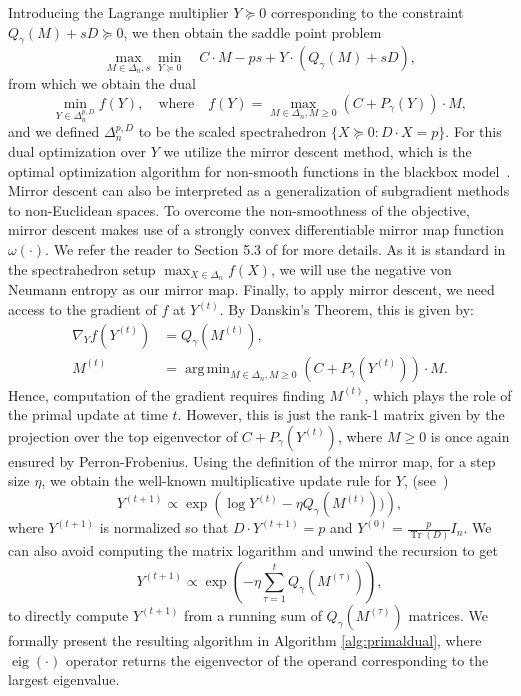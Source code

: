 \documentclass{article}
\DeclareMathOperator{\Tr}{Tr}
\DeclareMathOperator{\argmin}{arg\,min}
\begin{document}
Introducing the Lagrange multiplier $Y \succeq 0$ corresponding to the constraint $Q_\gamma(M) + s D \succeq 0$, we then obtain the saddle point problem
\[ \max_{M \in \Delta_n, s} \min_{Y \succeq 0} \quad C \cdot M - p s + Y \cdot (Q_\gamma(M) + s D), \]
from which we obtain the dual 
\begin{equation*}
  \min_{Y \in \Delta_n^{p,D}} f(Y), \quad \textrm{where} \quad f(Y) = \max_{M \in \Delta_n, M \geq 0} \left( C + P_\gamma(Y) \right) \cdot M,
  \label{eq:primaldual}
\end{equation*}
and we defined $\Delta_n^{p,D}$ to be the scaled spectrahedron $\{ X \succeq 0 : D \cdot X = p \}$.
For this dual optimization over $Y$ we utilize the mirror descent method, which is the optimal optimization algorithm for non-smooth functions in the blackbox model~\cite{lectures}. Mirror descent can also be interpreted as a generalization of subgradient methods to non-Euclidean spaces.
To overcome the non-smoothness of the objective, mirror descent makes use of a strongly convex differentiable mirror map function $\omega(\cdot)$. We refer the reader to Section 5.3 of \cite{lectures} for more details.
%
As it is standard in the spectrahedron setup $\max_{X \in \Delta_n} f(X)$, we will use the negative von Neumann entropy 
as our mirror map. 
Finally, to apply mirror descent, we need access to the gradient of $f$ at $Y^{(t)}$. By Danskin's Theorem, this is given by:
\begin{align*}
\nabla_Y f(Y^{(t)}) & = Q_\gamma(M^{(t)}), \\
M^{(t)} & = \argmin_{M \in \Delta_n, M \geq 0} (C + P_\gamma(Y^{(t)}))\cdot M  .
\end{align*}
Hence, computation of the gradient requires finding $M^{(t)}$, which plays the role of the primal update at time $t$. However, this is just the rank-1 matrix given by the projection over the top eigenvector of $C + P_\gamma(Y^{(t)})$, where $M \geq 0$ is once again ensured by Perron-Frobenius.
Using the definition of the mirror map, for a step size $\eta$, we obtain the well-known multiplicative update rule for $Y$, (see~\cite{Kivinen1997})
\begin{equation*}%
  Y^{(t+1)} \propto \exp \left( \log Y^{(t)} - \eta Q_\gamma(M^{(t)})) \right),
\end{equation*}
where $Y^{(t+1)}$ is normalized so that $D \cdot Y^{(t+1)} = p$ and $Y^{(0)} = \frac{p}{\Tr(D)} I_n$. 
We can also avoid computing the matrix logarithm and unwind the recursion to get
\[ Y^{(t+1)} \propto \exp \left( -\eta \sum_{\tau=1}^t Q_\gamma(M^{(\tau)}) \right), \]
to directly compute $Y^{(t+1)}$ from a running sum of $Q_\gamma(M^{(\tau)})$ matrices.
We formally present the resulting algorithm in Algorithm \ref{alg:primaldual}, where $\operatorname{eig}(\cdot)$ operator returns the eigenvector of the operand corresponding to the largest eigenvalue.
\end{document}
